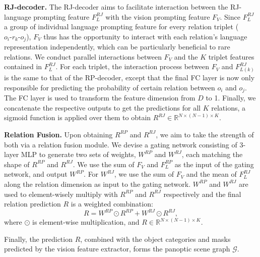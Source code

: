 \noindent \textbf{RJ-decoder.}
The RJ-decoder aims to facilitate interaction between the RJ-language prompting feature $F_{L}^{RJ}$ with the vision prompting feature $F_{V}$.
Since $F_{L}^{RJ}$ a group of individual language prompting feature for every relation triplet ($o_i\text{-}r_{k}\text{-}o_j$), $F_V$ thus has the opportunity to interact with each relation's language representation independently, which can be particularly beneficial to rare relations.
We conduct parallel interactions between $F_V$ and the $K$ triplet features contained in $F_L^{RJ}$.
For each triplet, the interaction process between $F_V$ and $F_{L(k)}^{RJ}$ is the same to that of the RP-decoder, except that the final FC layer is now only responsible for predicting the probability of certain relation between $o_i$ and $o_j$. The FC layer is used to transform the feature dimension from $D$ to 1.
Finally, we concatenate the respective outputs to get the predictions for all $K$ relations, a sigmoid function is applied over them to obtain $R^{RJ} \in \mathbb{R}^{N \times (N-1) \times K}$.

\noindent \textbf{Relation Fusion.}
Upon obtaining $R^{RP}$ and $R^{RJ}$, we aim to take the strength of both via a relation fusion module.
We devise a gating network consisting of 3-layer MLP to generate two sets of weights, $W^{RP}$ and $W^{RJ}$, each matching the shape of $R^{RP}$ and $R^{RJ}$.
We use the sum of $F_V$ and $F_{L}^{RP}$ as the input of the gating network, and output $W^{RP}$.
For $W^{RJ}$, we use the sum of $F_V$ and the mean of $F_{L}^{RJ}$ along the relation dimension as input to the gating network.
$W^{RP}$ and $W^{RJ}$ are used to element-wisely multiply with $R^{RP}$ and $R^{RJ}$ respectively and the final relation prediction $R$ is a weighted combination:
\begin{equation}
    R = W^{RP} \odot R^{RP} + W^{RJ} \odot R^{RJ},
\end{equation}
where $\odot$ is element-wise multiplication, and $R \in \mathbb{R}^{N \times (N-1) \times K}$.

Finally, the prediction $R$, combined with the object categories and masks predicted by the vision feature extractor, forms the panoptic scene graph $\mathcal{G}$.



